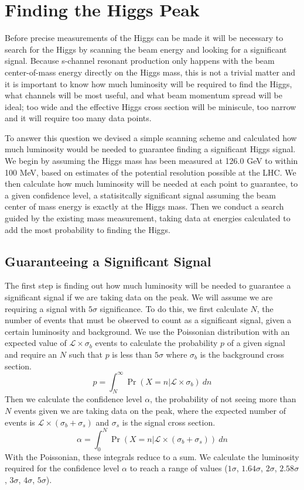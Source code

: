 \documentclass[a4paper]{article}
\begin{document}
\section{Finding the Higgs Peak}
	Before precise measurements of the Higgs can be made it will be necessary to search for the Higgs by scanning the beam energy and looking for a significant signal. Because s-channel resonant production only happens with the beam center-of-mass energy directly on the Higgs mass, this is not a trivial matter and it is important to know how much luminosity will be required to find the Higgs, what channels will be most useful, and what beam momentum spread will be ideal; too wide and the effective Higgs cross section will be miniscule, too narrow and it will require too many data points.

	To answer this question we devised a simple scanning scheme and calculated how much luminosity would be needed to guarantee finding a significant Higgs signal. We begin by assuming the Higgs mass has been measured at 126.0 GeV to within 100 MeV, based on estimates of the potential resolution possible at the LHC.\cite{lhc-higgs-width} We then calculate how much luminosity will be needed at each point to guarantee, to a given confidence level, a statisitcally significant signal assuming the beam center of mass energy is exactly at the Higgs mass. Then we conduct a search guided by the existing mass measurement, taking data at energies calculated to add the most probability to finding the Higgs.

	\subsection{Guaranteeing a Significant Signal}
	The first step is finding out how much luminosity will be needed to guarantee a significant signal if we are taking data on the peak. We will assume we are requiring a signal with $5\sigma$ significance. To do this, we first calculate $N$, the number of events that must be observed to count as a significant signal, given a certain luminosity and background. We use the Poissonian distribution with an expected value of $\mathcal{L}\times \sigma_b$ events to calculate the probability $p$ of a given signal and require an $N$ such that $p$ is less than $5\sigma$ where $\sigma_b$ is the background cross section.
	\begin{equation}
		p = \int_N^\infty \Pr(X=n|\mathcal{L}\times \sigma_b)\ dn\label{eq:p-value}
	\end{equation}
	Then we calculate the confidence level $\alpha$, the probability of not seeing more than $N$ events given we are taking data on the peak, where the expected number of events is $\mathcal{L}\times(\sigma_b+\sigma_s)$ and $\sigma_s$ is the signal cross section.
	\begin{equation}
		\alpha = \int_0^N \Pr(X=n|\mathcal{L}\times(\sigma_b+\sigma_s))\ dn\label{eq:alpha}
	\end{equation}
	With the Poissonian, these integrals reduce to a sum. We calculate the luminosity required for the confidence level $\alpha$ to reach a range of values ($1\sigma$, $1.64\sigma$, $2\sigma$, $2.58\sigma$, $3\sigma$, $4\sigma$, $5\sigma$).
\end{document}
